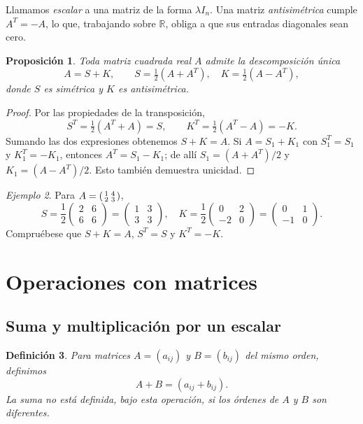 \documentclass[12pt]{article}
\newtheorem{definicion}{Definición}[section]
\newtheorem{proposicion}[definicion]{Proposición}
\theoremstyle{remark}
\newtheorem{ejemplo}[definicion]{Ejemplo}
\newcommand{\R}{\mathbb{R}}
\begin{document}
Llamamos \emph{escalar} a una matriz de la forma $\lambda I_n$. Una matriz \emph{antisimétrica} cumple $A^T=-A$, lo que, trabajando sobre $\R$, obliga a que sus entradas diagonales sean cero.
\begin{proposicion}
Toda matriz cuadrada real $A$ admite la descomposición única
\[
\boxed{A=S+K,\qquad S=\tfrac12(A+A^T),\quad K=\tfrac12(A-A^T),}
\]
donde $S$ es simétrica y $K$ es antisimétrica.
\end{proposicion}
\begin{proof}
Por las propiedades de la transposición,
\[
S^T=\tfrac12(A^T+A)=S,\qquad K^T=\tfrac12(A^T-A)=-K.
\]
Sumando las dos expresiones obtenemos $S+K=A$. Si $A=S_1+K_1$ con $S_1^T=S_1$ y $K_1^T=-K_1$, entonces $A^T=S_1-K_1$; de allí $S_1=(A+A^T)/2$ y $K_1=(A-A^T)/2$. Esto también demuestra unicidad.
\end{proof}
\begin{ejemplo}
Para $A=\begin{psmallmatrix}1&4\\2&3\end{psmallmatrix}$,
\[
S=\frac12\begin{pmatrix}2&6\\6&6\end{pmatrix}=\begin{pmatrix}1&3\\3&3\end{pmatrix},\quad
K=\frac12\begin{pmatrix}0&2\\-2&0\end{pmatrix}=\begin{pmatrix}0&1\\-1&0\end{pmatrix}.
\]
Compruébese que $S+K=A$, $S^T=S$ y $K^T=-K$.
\end{ejemplo}

\section{Operaciones con matrices}

\subsection*{Suma y multiplicación por un escalar}
\begin{definicion}
Para matrices $A=(a_{ij})$ y $B=(b_{ij})$ del \emph{mismo orden}, definimos
\[
A+B=(a_{ij}+b_{ij}).
\]
La suma no está definida, bajo esta operación, si los órdenes de $A$ y $B$ son diferentes.
\end{definicion}
\end{document}
